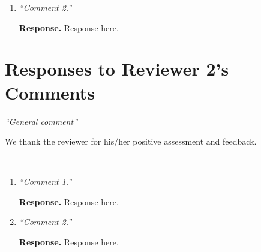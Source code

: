 \documentclass[11pt]{article}
\begin{document}
\begin{enumerate}[label=R1.\arabic*]
\begin{bullets}
\begin{bullets}
\begin{bullets}
\begin{bullets}
\begin{bullets}
\begin{bullets}
                              \end{bullets}

                          \end{bullets}

                      \end{bullets}

                  \end{bullets}

              \end{bullets}

          \end{bullets}



          \item{\it ``Comment 2.''}

                {\bf Response.} Response here.
\end{enumerate}

\section*{Responses to Reviewer 2's Comments}

 {\it ``General comment''}

\vspace*{0.5em} 
We thank the reviewer for
his/her positive assessment and feedback.

~\\[.1cm]

\begin{enumerate}[label=R2.\arabic*]

    \item {\it ``Comment 1.''}

          {\bf Response.} Response here.


          \item{\it ``Comment 2.''}

                {\bf Response.} Response here.
\end{enumerate}

\printmybibliography
\end{document}
